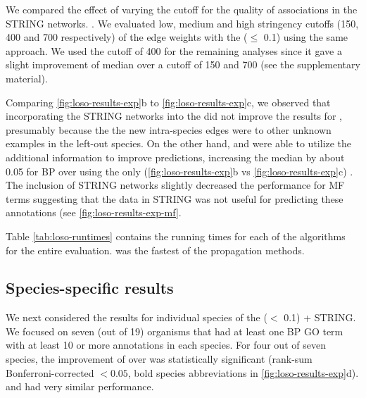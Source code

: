 We compared the effect of varying the cutoff for the quality of associations in the STRING networks.
.
We evaluated low, medium and high stringency cutoffs (150, 400 and 700 respectively) of the edge weights with the \SSN (\eval $\leq$ 0.1) using the same \loso approach. We used the cutoff of 400 for the remaining analyses since it gave a slight improvement of median \fmax over a cutoff of 150 and 700 (see the supplementary material). 

Comparing \cref{fig:loso-results-exp}b to \cref{fig:loso-results-exp}c, we observed that 
incorporating the STRING networks into the \SSN did not improve the results for \localplus, presumably because the the new intra-species edges were to other unknown examples in the left-out species. On the other hand, \sinksource and \genemania were able to utilize the additional information to improve predictions, increasing the median \fmax by about 0.05 for BP over using the \SSN only (\cref{fig:loso-results-exp}b vs \cref{fig:loso-results-exp}c) . The inclusion of STRING networks slightly decreased the performance for MF terms suggesting that the data in STRING was not useful for predicting these annotations (see \cref{fig:loso-results-exp-mf}. 

Table \ref{tab:loso-runtimes} contains the running times for each of the algorithms for the entire \loso evaluation. \sinksource was the fastest of the propagation methods. 


\subsection{Species-specific results}
\label{sec:loso-species-specific}
We next considered the results for individual species of the \SSN (\eval $<$ 0.1) + STRING. We focused on seven (out of 19) organisms that had at least one BP GO term with at least 10 or more annotations in each species.
For four out of seven species, the improvement of \sinksource over \localplus was statistically significant (rank-sum Bonferroni-corrected \pval $< 0.05$, bold species abbreviations in \cref{fig:loso-results-exp}d). 
\genemania and \sinksource had very similar performance. 

